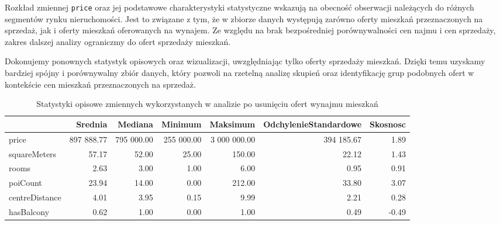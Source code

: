 \documentclass{report}
\begin{document}
Rozkład zmiennej \texttt{price} oraz jej podstawowe charakterystyki statystyczne wskazują na obecność obserwacji należących do różnych segmentów rynku nieruchomości. Jest to związane z tym, że w zbiorze danych występują zarówno oferty mieszkań przeznaczonych na sprzedaż, jak i oferty mieszkań oferowanych na wynajem. Ze względu na brak bezpośredniej porównywalności cen najmu i cen sprzedaży, zakres dalszej analizy ograniczmy do ofert sprzedaży mieszkań.

Dokonujemy ponownych statystyk opisowych oraz wizualizacji, uwzględniając tylko oferty sprzedaży mieszkań. Dzięki temu uzyskamy bardziej spójny i porównywalny zbiór danych, który pozwoli na rzetelną analizę skupień oraz identyfikację grup podobnych ofert w kontekście cen mieszkań przeznaczonych na sprzedaż.

\begin{table}[H]

\caption{Statystyki opisowe zmiennych wykorzystanych w analizie po usunięciu ofert wynajmu mieszkań}
\centering
\begin{tabular}[t]{lrrrrrr}
\toprule
  & Srednia & Mediana & Minimum & Maksimum & OdchylenieStandardowe & Skosnosc\\
\midrule
price & 897 888.77 & 795 000.00 & 255 000.00 & 3 000 000.00 & 394 185.67 & 1.89\\
squareMeters & 57.17 & 52.00 & 25.00 & 150.00 & 22.12 & 1.43\\
rooms & 2.63 & 3.00 & 1.00 & 6.00 & 0.95 & 0.91\\
poiCount & 23.94 & 14.00 & 0.00 & 212.00 & 33.80 & 3.07\\
centreDistance & 4.01 & 3.95 & 0.15 & 9.99 & 2.21 & 0.28\\
hasBalcony & 0.62 & 1.00 & 0.00 & 1.00 & 0.49 & -0.49\\
\bottomrule
\end{tabular}
\end{table}
\end{document}
